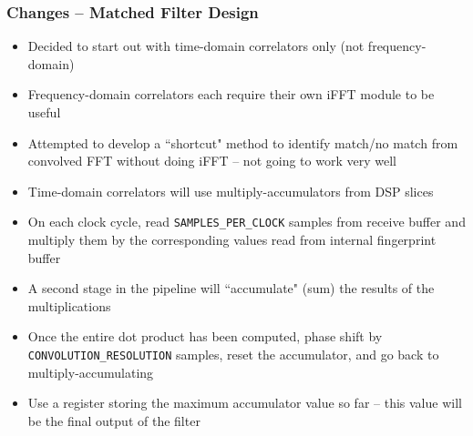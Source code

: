 \documentclass{beamer}
\begin{document}
    \begin{frame}
        \frametitle{Changes -- Matched Filter Design}

        \begin{itemize}
            \item<only@1> Decided to start out with time-domain correlators only (not frequency-domain)

            \item<only@1> Frequency-domain correlators each require their own iFFT module to be useful

            \item<only@1> Attempted to develop a ``shortcut" method to identify match/no match from convolved FFT without doing iFFT -- not going to work very well

            \item<only@2> Time-domain correlators will use multiply-accumulators from DSP slices

            \item<only@2> On each clock cycle, read \lstinline{SAMPLES_PER_CLOCK} samples from receive buffer and multiply them by the corresponding values read from internal fingerprint buffer

            \item<only@2> A second stage in the pipeline will ``accumulate" (sum) the results of the multiplications

            \item<only@2> Once the entire dot product has been computed, phase shift by \lstinline{CONVOLUTION_RESOLUTION} samples, reset the accumulator, and go back to multiply-accumulating

            \item<only@2> Use a register storing the maximum accumulator value so far -- this value will be the final output of the filter
        \end{itemize}
    \end{frame}
\end{document}
